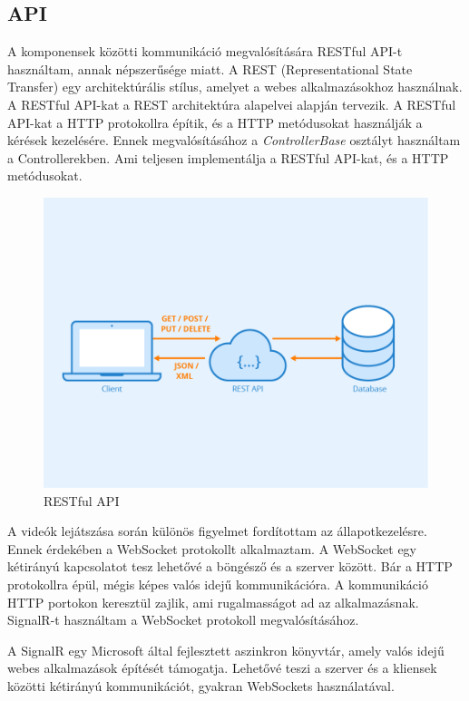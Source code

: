 \subsection*{API}
A komponensek közötti kommunikáció megvalósítására RESTful API-t használtam, annak népszerűsége miatt. A REST (Representational State Transfer) egy architektúrális stílus,
amelyet a webes alkalmazásokhoz használnak. A RESTful API-kat a REST architektúra alapelvei alapján tervezik.
A RESTful API-kat a HTTP protokollra építik, és a HTTP metódusokat használják a kérések kezelésére.
Ennek megvalósításához a \textit{ControllerBase} osztályt használtam a Controllerekben.
Ami teljesen implementálja a RESTful API-kat, és a HTTP metódusokat.

\begin{figure}[H]
    \centering
    \includegraphics[width=9.0truecm]{images/Rest-API.png}
    \caption[RESTful API]{RESTful API \cite{restfulapi}}
    \label{fig:restfulapi}
\end{figure}

A videók lejátszása során különös figyelmet fordítottam
az állapotkezelésre. Ennek érdekében a WebSocket
protokollt alkalmaztam. A WebSocket egy kétirányú
kapcsolatot tesz lehetővé a böngésző és a szerver között.
Bár a HTTP protokollra épül, mégis képes valós idejű
kommunikációra. A kommunikáció HTTP portokon keresztül zajlik,
ami rugalmasságot ad az alkalmazásnak.
SignalR-t használtam a WebSocket protokoll megvalósításához.

A SignalR egy Microsoft által fejlesztett aszinkron könyvtár,
amely valós idejű webes alkalmazások építését támogatja.
Lehetővé teszi a szerver és a kliensek közötti kétirányú
kommunikációt, gyakran WebSockets használatával.

